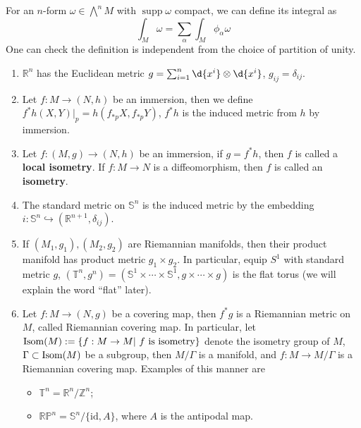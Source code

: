 \begin{rem}
    For an $n$-form $\omega\in\bigwedge^nM$ with $\operatorname{supp}\omega$ compact, we can define its integral as
    \[\int_M\omega=\sum_\alpha\int_M\phi_\alpha\omega\]
    One can check the definition is independent from the choice of partition of unity.
\end{rem}

\begin{eg}
    \begin{enumerate}[(1)]
        \item $\mathbb{R}^n$ has the Euclidean metric $g=\sum_{i=1}^n\d{x^i}\otimes\d{x^i}$, $g_{ij}=\delta_{ij}$.
        \item Let $f:M\to(N,h)$ be an immersion, then we define $f^*h(X,Y)|_p=h(f_{*p}X,f_{*p}Y)$, $f^*h$ is the induced metric from $h$ by immersion.
        \item Let $f:(M,g)\to(N,h)$ be an immersion, if $g=f^*h$, then $f$ is called a \textbf{local isometry}.
        If $f:M\to N$ is a diffeomorphism, then $f$ is called an \textbf{isometry}.
        \item The standard metric on $\mathbb{S}^n$ is the induced metric by the embedding $i:\mathbb{S}^n\hookrightarrow(\mathbb{R}^{n+1},\delta_{ij})$.
        \item If $(M_1,g_1),(M_2,g_2)$ are Riemannian manifolds, then their product manifold has product metric $g_1\times g_2$.
        In particular, equip $S^1$ with standard metric $g$, $(\mathbb{T}^n,g^n)=(\mathbb{S}^1\times\cdots\times\mathbb{S}^1,g\times\cdots\times g)$ is the flat torus (we will explain the word ``flat'' later).
        \item Let $f:M\to(N,g)$ be a covering map, then $f^*g$ is a Riemannian metric on $M$, called Riemannian covering map.
        In particular, let $\operatorname{Isom}(M):=\{f:M\to M|\ f\ \text{is isometry}\}$ denote the isometry group of $M$, $\Gamma\subset\operatorname{Isom}(M)$ be a subgroup, then $M/\Gamma$ is a manifold, and $f:M\to M/\Gamma$ is a Riemannian covering map.
        Examples of this manner are
        \begin{itemize}
            \item $\mathbb{T}^n=\mathbb{R}^n/\mathbb{Z}^n$;
            \item $\mathbb{RP}^n=\mathbb{S}^n/\{\mathrm{id},A\}$, where $A$ is the antipodal map.
        \end{itemize}
    \end{enumerate}
\end{eg}

